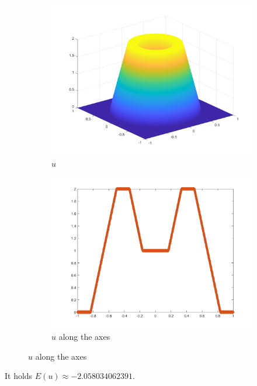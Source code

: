 \begin{frame}
  \begin{figure}[!ht]
    \centering
    \begin{subfigure}{.4\linewidth}
      \includegraphics[width=\linewidth]
        {pictures/experiments/settings/f01/exactSolution.png}
      \caption*{$u$}
    \end{subfigure}
    \quad
    \begin{subfigure}{.4\linewidth}
      \includegraphics[width=\linewidth]
        {pictures/experiments/settings/f01/exactSolutionAxis.png}
      \caption*{$u$ along the axes}
    \end{subfigure}
  \end{figure}

  \pause
  It holds $E(u)\approx -2.058034062391$.
\end{frame}


